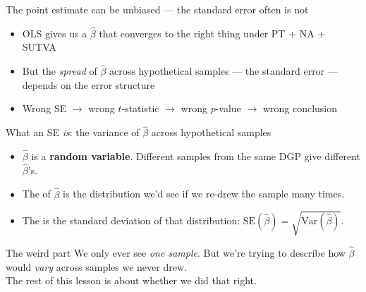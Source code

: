 \documentclass[aspectratio=169,11pt]{beamer}
\begin{document}
\begin{frame}{The point estimate can be unbiased --- the standard error often is not}
\vspace{0.6em}
\begin{itemize}
  \item OLS gives us a $\hat\beta$ that converges to the right thing under PT + NA + SUTVA
  \item But the \textit{spread} of $\hat\beta$ across hypothetical samples --- the standard error --- depends on the error structure
  \item Wrong SE $\rightarrow$ wrong $t$-statistic $\rightarrow$ wrong $p$-value $\rightarrow$ wrong conclusion
\end{itemize}
\vspace{0.6em}
\end{frame}

\begin{frame}{What an SE \textit{is}: the variance of $\hat\beta$ across hypothetical samples}
\vspace{0.4em}
\begin{itemize}\small
  \item $\hat\beta$ is a \textbf{random variable}. Different samples from the same DGP give different $\hat\beta$'s.
  \item The  of $\hat\beta$ is the distribution we'd see if we re-drew the sample many times.
  \item The  is the standard deviation of that distribution: \;$\text{SE}(\hat\beta) = \sqrt{\text{Var}(\hat\beta)}$.
\end{itemize}
\vspace{0.4em}
\begin{block}{The weird part}
\small
We only ever see \textit{one sample}. But we're trying to describe how $\hat\beta$ would \textit{vary} across samples we never drew. \\
 The rest of this lesson is about whether we did that right.
\end{block}
\end{frame}
\end{document}
